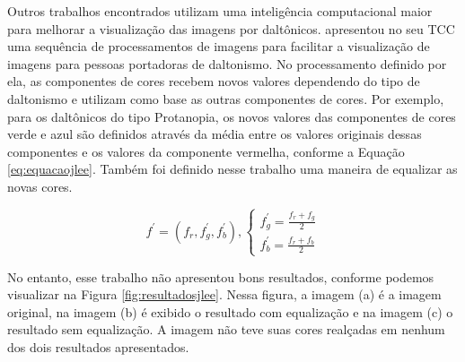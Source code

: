 \documentclass[	12pt, Times, openright, twoside, a4paper, english, brazil]{abntex2}
\begin{document}
Outros trabalhos encontrados utilizam uma inteligência computacional maior para melhorar a visualização das imagens por daltônicos.  apresentou no seu TCC uma sequência de processamentos de imagens para facilitar a visualização de imagens para pessoas portadoras de daltonismo. No processamento definido por ela, as componentes de cores recebem novos valores dependendo do tipo de daltonismo e utilizam como base as outras componentes de cores. Por exemplo, para os daltônicos do tipo Protanopia, os novos valores das componentes de cores verde e azul são definidos através da média entre os valores originais dessas componentes e os valores da componente vermelha, conforme a Equação \ref{eq:equacaojlee}. Também foi definido nesse trabalho uma maneira de equalizar as novas cores.

\begin{equation}
f^\prime =  (f_r, f_g^\prime, f_b^\prime), \left\{\begin{array}{rc}
f_g^\prime = \frac{f_r + f_g}{2}\\
f_b^\prime = \frac{f_r + f_b}{2}
\end{array}\right.
\label{eq:equacaojlee}
\end{equation}

No entanto, esse trabalho não apresentou bons resultados, conforme podemos visualizar na Figura \ref{fig:resultadosjlee}. Nessa figura, a imagem (a) é a imagem original, na imagem (b) é exibido o resultado com equalização e na imagem (c) o resultado sem equalização. A imagem não teve suas cores realçadas em nenhum dos dois resultados apresentados.
\end{document}
